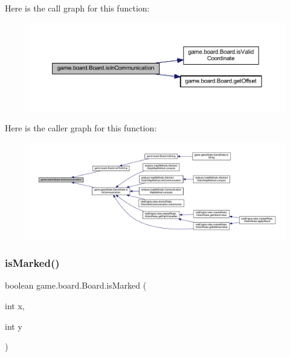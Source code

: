 Here is the call graph for this function\+:
\nopagebreak
\begin{figure}[H]
\begin{center}
\leavevmode
\includegraphics[width=350pt]{classgame_1_1board_1_1_board_aed2c46e80ddb40b36cbd09bb42b43974_cgraph}
\end{center}
\end{figure}
Here is the caller graph for this function\+:
\nopagebreak
\begin{figure}[H]
\begin{center}
\leavevmode
\includegraphics[width=350pt]{classgame_1_1board_1_1_board_aed2c46e80ddb40b36cbd09bb42b43974_icgraph}
\end{center}
\end{figure}
\mbox{\label{classgame_1_1board_1_1_board_af3a3c94fbe601ba799bfe105e0630be6}} 
\subsubsection{\texorpdfstring{is\+Marked()}{isMarked()}}
{\footnotesize\ttfamily boolean game.\+board.\+Board.\+is\+Marked (\begin{DoxyParamCaption}\item[{int}]{x,  }\item[{int}]{y }\end{DoxyParamCaption})\hspace{0.3cm}{\ttfamily [inline]}}



